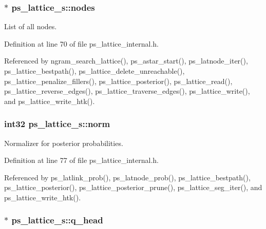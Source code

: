 \subsubsection[{nodes}]{$\ast$ ps\+\_\+lattice\+\_\+s\+::nodes}\label{structps__lattice__s_a838bd9223e35d012419e6225b54e393d}


List of all nodes. 



Definition at line 70 of file ps\+\_\+lattice\+\_\+internal.\+h.



Referenced by ngram\+\_\+search\+\_\+lattice(), ps\+\_\+astar\+\_\+start(), ps\+\_\+latnode\+\_\+iter(), ps\+\_\+lattice\+\_\+bestpath(), ps\+\_\+lattice\+\_\+delete\+\_\+unreachable(), ps\+\_\+lattice\+\_\+penalize\+\_\+fillers(), ps\+\_\+lattice\+\_\+posterior(), ps\+\_\+lattice\+\_\+read(), ps\+\_\+lattice\+\_\+reverse\+\_\+edges(), ps\+\_\+lattice\+\_\+traverse\+\_\+edges(), ps\+\_\+lattice\+\_\+write(), and ps\+\_\+lattice\+\_\+write\+\_\+htk().

\subsubsection[{norm}]{\setlength{\rightskip}{0pt plus 5cm}int32 ps\+\_\+lattice\+\_\+s\+::norm}\label{structps__lattice__s_a68c3259613a16628e1dd2e8147705d8e}


Normalizer for posterior probabilities. 



Definition at line 77 of file ps\+\_\+lattice\+\_\+internal.\+h.



Referenced by ps\+\_\+latlink\+\_\+prob(), ps\+\_\+latnode\+\_\+prob(), ps\+\_\+lattice\+\_\+bestpath(), ps\+\_\+lattice\+\_\+posterior(), ps\+\_\+lattice\+\_\+posterior\+\_\+prune(), ps\+\_\+lattice\+\_\+seg\+\_\+iter(), and ps\+\_\+lattice\+\_\+write\+\_\+htk().

\subsubsection[{q\+\_\+head}]{$\ast$ ps\+\_\+lattice\+\_\+s\+::q\+\_\+head}\label{structps__lattice__s_a26c029189074db2f668d5a9d67eb7af5}


